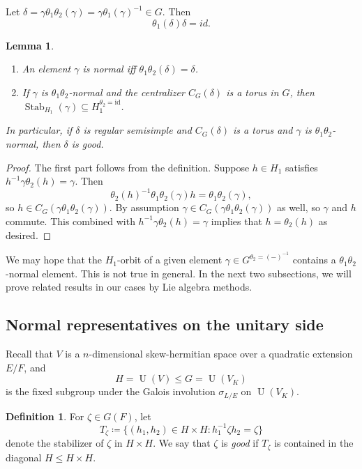 \documentclass[11pt, reqno]{amsart}
\numberwithin{equation}{subsection}
\theoremstyle{plain}
\newtheorem{lem}[proposition]{Lemma}
\theoremstyle{definition}
\newtheorem{definition}[proposition]{Definition}
\DeclareMathOperator{\Stab}{Stab}
\DeclareMathOperator{\U}{U}
\begin{document}
Let $\delta=\gamma \theta_1\theta_2(\gamma) = \gamma \theta_1(\gamma)^{-1} \in G$. Then 
\[
\theta_1(\delta) \delta =id.
\] 

\begin{lem}\label{lemma: normal implies good}
\begin{enumerate}
    \item An element $\gamma$ is normal iff $\theta_1 \theta_2(\delta)=\delta$.
    \item If $\gamma$ is $\theta_1\theta_2$-normal and
the centralizer $C_G(\delta)$ is a
torus in $G$, then $\Stab_{H_1}(\gamma) \subseteq H_1^{\theta_2=\mathrm{id}}$.
\end{enumerate}
In particular, if $\delta$ is regular semisimple and $C_G(\delta)$ is a torus and $\gamma$ is $\theta_1\theta_2$-normal, then $\delta$ is good.
\end{lem}
\begin{proof}
The first part follows from the definition. Suppose $h \in H_1$ satisfies $h^{-1}\gamma \theta_2(h)
= \gamma$. Then 
\[
    \theta_2(h)^{-1}\theta_1\theta_2(\gamma)
    h = \theta_1\theta_2(\gamma),
\]
so $h \in C_G(\gamma\theta_1\theta_2(\gamma))$.
By assumption 
$\gamma \in C_G(\gamma\theta_1\theta_2(\gamma))$
as well, so $\gamma$ and $h$ commute.
This combined with $h^{-1}\gamma \theta_2(h) 
= \gamma$ implies that $h = \theta_2(h)$ as desired.
\end{proof}

We may hope that the $H_1$-orbit of a given element $\gamma \in G^{\theta_2=(-)^{-1}}$ contains a $\theta_1\theta_2$-normal element. This is not true in general. In the next two subsections, we will prove related results in our cases by Lie algebra methods.








\subsection{Normal representatives on the unitary side}

Recall that $V$ is a $n$-dimensional skew-hermitian space over a quadratic extension $E/F$, and
\[
    H=\U(V) \leq G=\U(V_K)   
\]
is the fixed subgroup under the Galois involution $\sigma_{L/E}$ on $\U(V_K)$.

\begin{definition}
For $\zeta \in G(F)$, let
\[
    T_\zeta \coloneqq \{(h_1, h_2) \in H \times H
    : h_1^{-1}\zeta h_2 = \zeta\}
\]
denote the stabilizer of $\zeta$ in $H \times H$.
We say that $\zeta$ is
\emph{good} if $T_\zeta$ is contained in the
diagonal $H \le H \times H$.
\end{definition}
\end{document}
